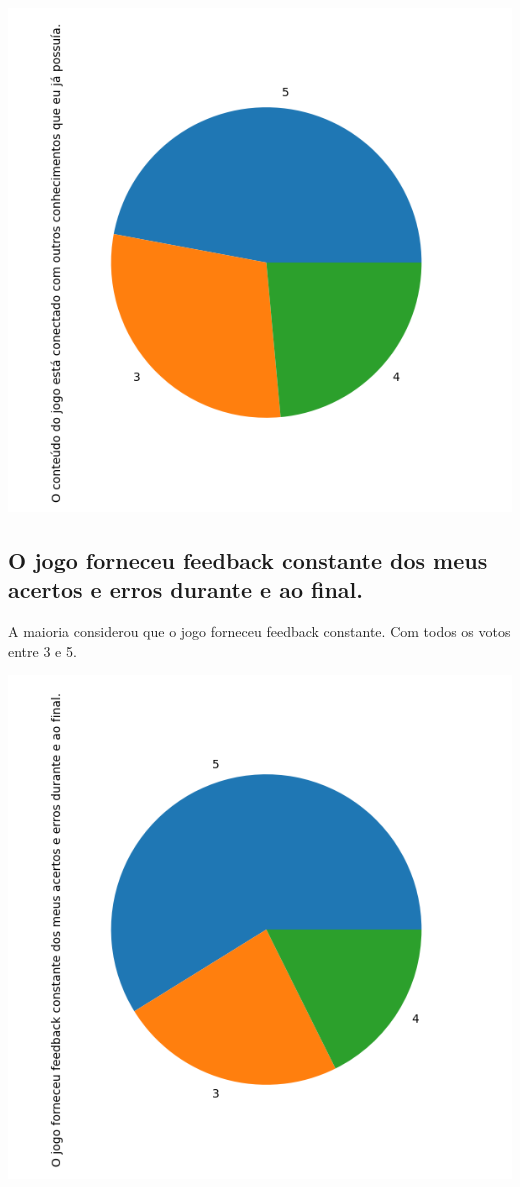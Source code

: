 \documentclass[12pt]{article}
\begin{document}
\begin{center}
  \includegraphics[scale=0.4]{O conteúdo do jogo está conectado com outros conhecimentos que eu já possuía..png}
\end{center}

\subsection{O jogo forneceu feedback constante dos meus acertos e erros durante e ao final.}

A maioria considerou que o jogo forneceu feedback constante. Com todos os votos entre 3 e 5.

\begin{center}
  \includegraphics[scale=0.4]{O jogo forneceu feedback constante dos meus acertos e erros durante e ao final..png}
\end{center}
\end{document}
